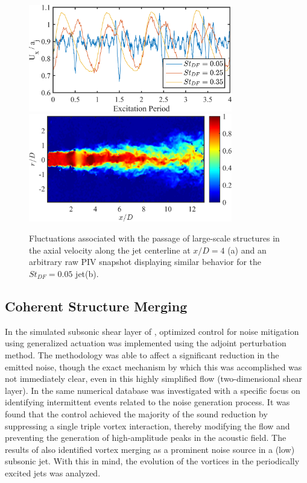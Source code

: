 \begin{figure}
	\centering
	\includegraphics[width=3.5in]{Figures/ch4_centerline_mach_temporal.png} \\
	\includegraphics[width=3.5in]{Figures/ch4_rawUx_acceleration.png}
	\label{fig:ch4_St005_rawUx_snapshot}
	\caption{Fluctuations associated with the passage of large-scale structures in the axial velocity along the jet centerline at $x/D = 4$ (a) and an arbitrary raw PIV snapshot displaying similar behavior for the $St_{DF}  = 0.05$ jet(b).}
\end{figure}

\subsection{Coherent Structure Merging}
In the simulated subsonic shear layer of \citet{Wei2006}, optimized control for noise mitigation using generalized actuation was implemented using the adjoint perturbation method.
The methodology was able to affect a significant reduction in the emitted noise, though the exact mechanism by which this was accomplished was not immediately clear, even in this highly simplified flow (two-dimensional shear layer).
In \citet{Cavalieri2010b} the same numerical database was investigated with a specific focus on identifying intermittent events related to the noise generation process.
It was found that the control achieved the majority of the sound reduction by suppressing a single triple vortex interaction, thereby modifying the flow and preventing the generation of high-amplitude peaks in the acoustic field.
The results of \citet{Kibens1980} also identified vortex merging as a prominent noise source in a (low) subsonic jet.
With this in mind, the evolution of the vortices in the periodically excited jets was analyzed.


